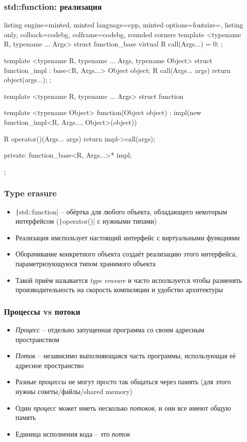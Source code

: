 \documentclass[10pt]{beamer}
\begin{document}
\begin{frame}[fragile]
\frametitle{std::function: реализация}
\begin{itemize}
\begin{tcblisting}{listing engine=minted, minted language=cpp, minted options={fontsize=\scriptsize}, listing only, colback=codebg, colframe=codebg, rounded corners}
template <typename R, typename ... Args>
struct function_base {
  virtual R call(Args...) = 0;
};

template <typename R, typename ... Args, typename Object>
struct function_impl : base<R, Args...> {
  Object object;
  R call(Args... args) { return object(args...); }
};

template <typename R, typename ... Args>
struct function {
  template <typename Object>
  function(Object object)
    : impl(new function_impl<R, Args..., Object>(object))
  {}

  R operator()(Args... args) { return impl->call(args); }

private:
  function_base<R, Args...>* impl;
};
\end{tcblisting}
\end{itemize}
\end{frame}

\begin{frame}[fragile]
\frametitle{Type erasure}
\begin{itemize}
\item \texttt|std::function| -- обёртка для любого объекта, обладающего некоторым интерфейсом (\texttt|operator()| с нужными типами)
\pause
\item Реализация имспользует настоящий интерфейс с виртуальными функциями
\pause
\item Оборачивание конкретного объекта создаёт реализацию этого интерфейса, параметризующуюся типом хранимого объекта
\pause
\item Такой приём называется \textit{type erasure} и часто используется чтобы разменять производительность на скорость компиляции и удобство архитектуры
\end{itemize}
\end{frame}

\begin{frame}[fragile]
\frametitle{Процессы vs потоки}
\begin{itemize}
\item \textit{Процесс} -- отдельно запущенная программа со своим адресным пространством
\pause
\item \textit{Поток} -- независимо выполняющаяся часть программы, использующая её адресное пространство
\pause
\item Разные \textit{процессы} не могут просто так общаться через память (для этого нужны сокеты/файлы/shared memory)
\pause
\item Один \textit{процесс} может иметь несколько \textit{потоков}, и они все имеют общую память
\pause
\item Единица исполнения кода -- это \textit{поток}
\end{itemize}
\end{frame}
\end{document}
